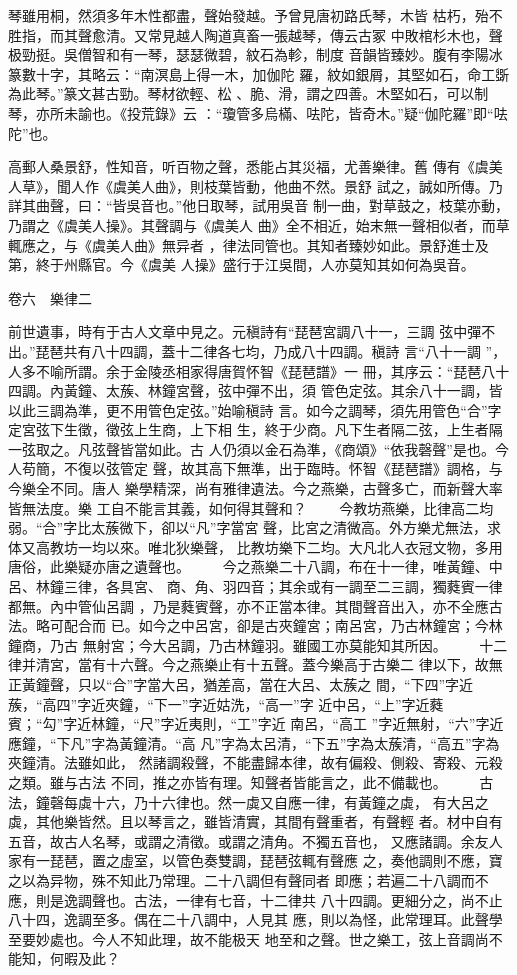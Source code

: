 \documentclass{ctexart}
\begin{document}
琴雖用桐，然須多年木性都盡，聲始發越。予曾見唐初路氏琴，木皆 枯朽，殆不胜指，而其聲愈清。又常見越人陶道真畜一張越琴，傳云古冢 中敗棺杉木也，聲极勁挺。吳僧智和有一琴，瑟瑟微碧，紋石為軫，制度 音韻皆臻妙。腹有李陽冰篆數十字，其略云：``南溟島上得一木，加伽陀 羅，紋如銀屑，其堅如石，命工斲為此琴。''篆文甚古勁。琴材欲輕、松 、脆、滑，謂之四善。木堅如石，可以制琴，亦所未諭也。《投荒錄》云 ：``瓊管多烏樠、呿陀，皆奇木。''疑``伽陀羅''即``呿陀''也。

高郵人桑景舒，性知音，听百物之聲，悉能占其災福，尤善樂律。舊 傳有《虞美人草》，聞人作《虞美人曲》，則枝葉皆動，他曲不然。景舒 試之，誠如所傳。乃詳其曲聲，曰：``皆吳音也。''他日取琴，試用吳音 制一曲，對草鼓之，枝葉亦動，乃謂之《虞美人操》。其聲調与《虞美人 曲》全不相近，始末無一聲相似者，而草輒應之，与《虞美人曲》無异者 ，律法同管也。其知者臻妙如此。景舒進士及第，終于州縣官。今《虞美 人操》盛行于江吳間，人亦莫知其如何為吳音。

卷六　樂律二

前世遺事，時有于古人文章中見之。元稹詩有``琵琶宮調八十一，三調 弦中彈不出。''琵琶共有八十四調，蓋十二律各七均，乃成八十四調。稹詩 言``八十一調 ''，人多不喻所謂。余于金陵丞相家得唐賀怀智《琵琶譜》一 冊，其序云：``琵琶八十四調。內黃鐘、太蔟、林鐘宮聲，弦中彈不出，須 管色定弦。其余八十一調，皆以此三調為準，更不用管色定弦。''始喻稹詩 言。如今之調琴，須先用管色``合''字定宮弦下生徵，徵弦上生商，上下相 生，終于少商。凡下生者隔二弦，上生者隔一弦取之。凡弦聲皆當如此。古 人仍須以金石為準，《商頌》``依我磬聲''是也。今人苟簡，不復以弦管定 聲，故其高下無準，出于臨時。怀智《琵琶譜》調格，与今樂全不同。唐人 樂學精深，尚有雅律遺法。今之燕樂，古聲多亡，而新聲大率皆無法度。樂 工自不能言其義，如何得其聲和？ 　　今教坊燕樂，比律高二均弱。``合''字比太蔟微下，卻以``凡''字當宮 聲，比宮之清微高。外方樂尤無法，求体又高教坊一均以來。唯北狄樂聲， 比教坊樂下二均。大凡北人衣冠文物，多用唐俗，此樂疑亦唐之遺聲也。 　　今之燕樂二十八調，布在十一律，唯黃鐘、中呂、林鐘三律，各具宮、 商、角、羽四音；其余或有一調至二三調，獨蕤賓一律都無。內中管仙呂調 ，乃是蕤賓聲，亦不正當本律。其間聲音出入，亦不全應古法。略可配合而 已。如今之中呂宮，卻是古夾鐘宮；南呂宮，乃古林鐘宮；今林鐘商，乃古 無射宮；今大呂調，乃古林鐘羽。雖國工亦莫能知其所因。 　　十二律并清宮，當有十六聲。今之燕樂止有十五聲。蓋今樂高于古樂二 律以下，故無正黃鐘聲，只以``合''字當大呂，猶差高，當在大呂、太蔟之 間，``下四''字近蔟，``高四''字近夾鐘，``下一''字近姑洗，``高一''字 近中呂，``上''字近蕤賓；``勾''字近林鐘，``尺''字近夷則，``工''字近 南呂，``高工 ''字近無射，``六''字近應鐘，``下凡''字為黃鐘清。``高 凡''字為太呂清，``下五''字為太蔟清，``高五''字為夾鐘清。法雖如此， 然諸調殺聲，不能盡歸本律，故有偏殺、側殺、寄殺、元殺之類。雖与古法 不同，推之亦皆有理。知聲者皆能言之，此不備載也。 　　古法，鐘磬每虡十六，乃十六律也。然一虡又自應一律，有黃鐘之虡， 有大呂之虡，其他樂皆然。且以琴言之，雖皆清實，其間有聲重者，有聲輕 者。材中自有五音，故古人名琴，或謂之清徵。或謂之清角。不獨五音也， 又應諸調。余友人家有一琵琶，置之虛室，以管色奏雙調，琵琶弦輒有聲應 之，奏他調則不應，寶之以為异物，殊不知此乃常理。二十八調但有聲同者 即應；若遍二十八調而不應，則是逸調聲也。古法，一律有七音，十二律共 八十四調。更細分之，尚不止八十四，逸調至多。偶在二十八調中，人見其 應，則以為怪，此常理耳。此聲學至要妙處也。今人不知此理，故不能极天 地至和之聲。世之樂工，弦上音調尚不能知，何暇及此？
\end{document}
